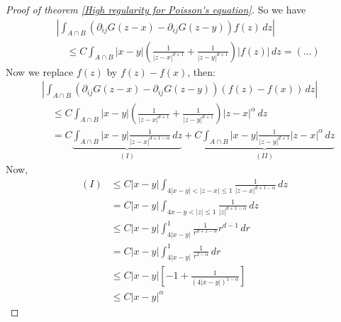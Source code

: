 \documentclass{report}
\theoremstyle{tommy}
\begin{document}
\begin{proof}[Proof of theorem \ref{High regularity for Poisson's equation}]
    So we have 
    \begin{align*}
      &\left| \int_{A \cap B} (\partial_{ij} G(z-x) - \partial_{ij} G(z-y)) f(z) \, dz \right| \\
      &\quad \le C \int_{A \cap B} |x-y| \left(\frac{1}{|z-x|^{d+1}} + \frac{1}{|z-y|^{d+1}}\right) |f(z)| \, dz = (\ldots)
    \end{align*}
    Now we replace \(f(z)\) by \(f(z) - f(x)\), then:
    \begin{align*}
      &\left| \int_{A \cap B} (\partial_{ij} G(z-x) - \partial_{ij} G(z-y)) (f(z)-f(x)) \, dz \right| \\
      &\quad \le C \int_{A \cap B} |x-y| \left(\frac{1}{|z-x|^{d+1}} + \frac{1}{|z-y|^{d+1}}\right) |z-x|^\alpha \, dz \\
      &\quad = C \underbrace{\int_{A \cap B} |x-y| \frac{1}{|z-x|^{d + 1 - \alpha}} \, dz}_{(I)} + \underbrace{C \int_{A \cap B} |x-y| \frac{1}{|z-y|^{d+1}}|z-x|^\alpha \, dz}_{(II)}
    \end{align*}
    Now, \begin{align*}
      (I) &\le C |x-y| \int_{4 |x-y| < |z-x| \le 1} \frac{1}{|z - x|^{d+1-\alpha}} \, dz \\
      &= C |x-y| \int_{4 {x-y} < |z| \le 1} \frac{1}{|z|^{d+1-\alpha}} \, dz \\
      &\le C|x-y| \int_{4|x-y|}^1 \frac{1}{r^{d+1-\alpha}}r^{d-1} \, dr \\
      &= C|x-y| \int_{4|x-y|}^1 \frac{1}{r^{2-\alpha}} \, dr \\
      &\le C |x-y| \left[-1 + \frac{1}{(4|x-y|)^{1-\alpha}}\right] \\
      &\le C|x-y|^\alpha
    \end{align*}


\end{proof}
\end{document}

